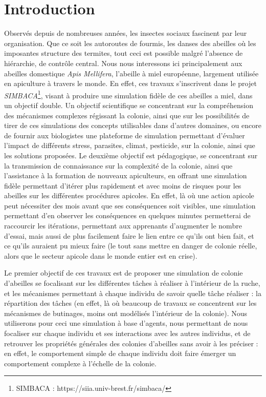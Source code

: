 \chapter*{Introduction}


	Observés depuis de nombreuses années, les insectes sociaux fascinent par leur organisation. Que ce soit les autoroutes de fourmis, les danses des abeilles où les imposantes structure des termites, tout ceci est possible malgré l'absence de hiérarchie, de contrôle central. Nous nous interessons ici principalement aux abeilles domestique \textit{Apis Mellifera}, l'abeille à miel européenne, largement utilisée en apiculture à travers le monde. En effet, ces travaux s'inscrivent dans le projet \textit{SIMBACA}\footnote{SIMBACA : https://siia.univ-brest.fr/simbaca/}, visant à produire une simulation fidèle de ces abeilles a miel, dans un objectif double. Un objectif scientifique se concentrant sur la compréhension des mécanismes complexes régissant la colonie, ainsi que sur les possibilités de tirer de ces simulations des concepts utilisables dans d'autres domaines, ou encore de fournir aux biologistes une plateforme de simulation permettant d'évaluer l'impact de différents stress, parasites, climat, pesticide, sur la colonie, ainsi que les solutions proposées. Le deuxième objectif est pédagogique, se concentrant sur la transmission de connaissance sur la complexité de la colonie, ainsi que l'assistance à la formation de nouveaux apiculteurs, en offrant une simulation fidèle permettant d'itérer plus rapidement et avec moins de risques pour les abeilles sur les différentes procédures apicoles. En effet, là où une action apicole peut nécessiter des mois avant que ses conséquences soit visibles, une simulation permettant d'en observer les conséquences en quelques minutes permetterai de raccourcir les itérations, permettant aux apprenants d'augmenter le nombre d'essai, mais aussi de plus facilement faire le lien entre ce qu'ils ont bien fait, et ce qu'ils auraient pu mieux faire (le tout sans mettre en danger de colonie réelle, alors que le secteur apicole dans le monde entier est en crise\cite{johnson_honey_2010}).

	Le premier objectif de ces travaux est de proposer une simulation de colonie d'abeilles se focalisant sur les différentes tâches à réaliser à l'intérieur de la ruche, et les mécanismes permettant à chaque individu de savoir quelle tâche réaliser : la répartition des tâches (en effet, là où beaucoup de travaux se concentrent sur les mécanismes de butinages, moins ont modélisés l'intérieur de la colonie). Nous utiliserons pour ceci une simulation à base d'agents, nous permettant de nous focaliser sur chaque individu et ses interactions avec les autres individus, et de retrouver les propriétés générales des colonies d'abeilles sans avoir à les préciser : en effet, le comportement simple de chaque individu doit faire émerger un comportement complexe à l'échelle de la colonie. 
	
